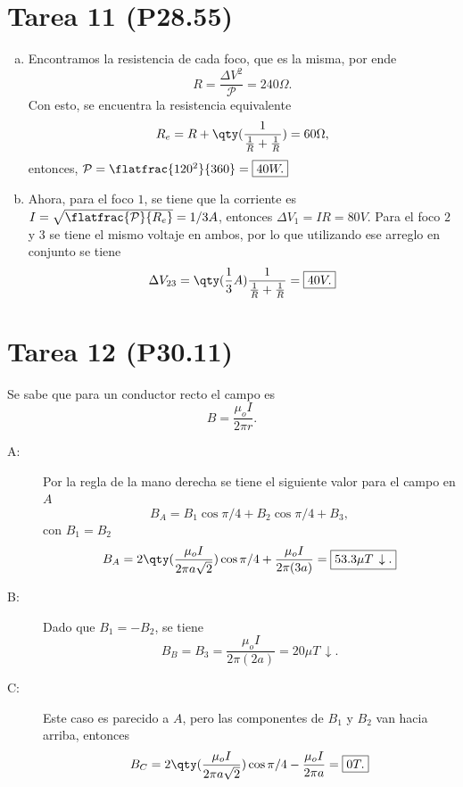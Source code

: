 \section*{Tarea 11 (P28.55)}

\begin{enumerate}[a)]
	\item Encontramos la resistencia de cada foco, que es la misma, por ende
			$$ R = \frac{\Delta V ^2}{\mathcal{P}} = 240 \Omega . $$
		Con esto, se encuentra la resistencia equivalente
			$$ R_e = R + \qty(\frac{1}{\frac{1}{R} + \frac{1}{R}}) = 60\Omega , $$
		entonces, $\mathcal{P} = \flatfrac{120^2}{360} = \boxed{40W.}$
	\item Ahora, para el foco $1$, se tiene que la corriente es $I = \sqrt{\flatfrac{\mathcal{P}}{R_e}} = 1/3 A$, entonces $\Delta V_1 = I R = \boxed{80V}$. Para el foco $2$ y $3$ se tiene el mismo voltaje en ambos, por lo que utilizando ese arreglo en conjunto se tiene
		$$ \Delta V_{23} = \qty(\frac{1}{3} A) \frac{1}{\frac{1}{R} + \frac{1}{R}} = \boxed{40V.} $$
\end{enumerate}















\section*{Tarea 12 (P30.11)}

Se sabe que para un conductor recto el campo es
	$$ B = \frac{\mu _o I}{2\pi r}. $$
\begin{description}
	\item[A:] Por la regla de la mano derecha se tiene el siguiente valor para el campo en $A$
		$$ B_A = B_1 \cos{\pi /4} + B_2 \cos{\pi /4} + B_3, $$
			con $B_1 = B_2$
				$$ B_A = 2\qty(\frac{\mu _o I}{2\pi a\sqrt{2}}) \cos{\pi /4} + \frac{\mu _o I}{2\pi (3a)} = \boxed{ 53.3\mu T \, \downarrow . } $$
	\item[B:] Dado que $B_1 = -B_2$, se tiene
		$$ B_B = B_3 = \frac{\mu _o I}{2\pi (2a)} = \boxed{ 20\mu T \, \downarrow . } $$
	\item[C:] Este caso es parecido a $A$, pero las componentes de $B_1$ y $B_2$ van hacia arriba, entonces
		$$ B_C = 2\qty(\frac{\mu _o I}{2\pi a\sqrt{2}}) \cos{\pi /4} - \frac{\mu _o I}{2\pi a} = \boxed{ 0T. } $$
\end{description}

































